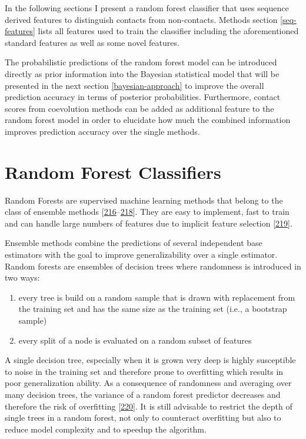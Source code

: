 \documentclass[11pt,a4paper,twoside]{book}
\providecommand{\tightlist}{%
  \setlength{\itemsep}{0pt}\setlength{\parskip}{0pt}}
\theoremstyle{definition}
\theoremstyle{definition}
\theoremstyle{remark}
\begin{document}
In the following sections I present a random forest classifier that uses
sequence derived features to distinguish contacts from non-contacts.
Methods section \ref{seq-features} lists all features used to train the
classifier including the aforementioned standard features as well as
some novel features.

The probabilistic predictions of the random forest model can be
introduced directly as prior information into the Bayesian statistical
model that will be presented in the next section \ref{bayesian-approach}
to improve the overall prediction accuracy in terms of posterior
probabilities. Furthermore, contact scores from coevolution methods can
be added as additional feature to the random forest model in order to
elucidate how much the combined information improves prediction accuracy
over the single methods.

\section{Random Forest Classifiers}\label{random-forest-classifiers}

Random Forests are supervised machine learning methods that belong to
the class of ensemble methods
{[}\protect\hyperlink{ref-Ho1998}{216}--\protect\hyperlink{ref-Breiman2001}{218}{]}.
They are easy to implement, fast to train and can handle large numbers
of features due to implicit feature selection
{[}\protect\hyperlink{ref-Menze2009}{219}{]}.

Ensemble methods combine the predictions of several independent base
estimators with the goal to improve generalizability over a single
estimator. Random forests are ensembles of decision trees where
randomness is introduced in two ways:

\begin{enumerate}
\def\labelenumi{\arabic{enumi}.}
\tightlist
\item
  every tree is build on a random sample that is drawn with replacement
  from the training set and has the same size as the training set (i.e.,
  a bootstrap sample)
\item
  every split of a node is evaluated on a random subset of features
\end{enumerate}

A single decision tree, especially when it is grown very deep is highly
susceptible to noise in the training set and therefore prone to
overfitting which results in poor generalization ability. As a
consequence of randomness and averaging over many decision trees, the
variance of a random forest predictor decreases and therefore the risk
of overfitting {[}\protect\hyperlink{ref-Louppe2014}{220}{]}. It is
still advisable to restrict the depth of single trees in a random
forest, not only to counteract overfitting but also to reduce model
complexity and to speedup the algorithm.
\end{document}
